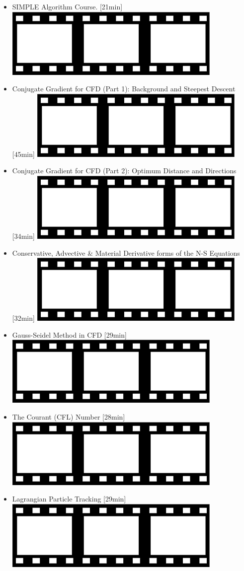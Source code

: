 \begin{itemize}

\item SIMPLE Algorithm Course. [21min]
      \href{https://www.youtube.com/watch?v=z1wMpZeVzMI}{\includegraphics[width=.8cm]{images/pictograms/film.png}}

\item Conjugate Gradient for CFD (Part 1): Background and Steepest Descent [45min]
      \href{https://www.youtube.com/watch?v=jXShvxPcRl4}{\includegraphics[width=.8cm]{images/pictograms/film.png}}

\item Conjugate Gradient for CFD (Part 2): Optimum Distance and Directions [34min]
      \href{https://www.youtube.com/watch?v=MdPhVsgTc1Q}{\includegraphics[width=.8cm]{images/pictograms/film.png}}

\item Conservative, Advective \& Material Derivative forms of the N-S Equations [32min]
      \href{https://www.youtube.com/watch?v=ljdv4T2U464}{\includegraphics[width=.8cm]{images/pictograms/film.png}}

\item Gauss-Seidel Method in CFD [29min]
      \href{https://www.youtube.com/watch?v=ymIvps7pgRk}{\includegraphics[width=.8cm]{images/pictograms/film.png}}

\item The Courant (CFL) Number [28min]
      \href{https://www.youtube.com/watch?v=WBWY46ynRk0}{\includegraphics[width=.8cm]{images/pictograms/film.png}}

\item Lagrangian Particle Tracking [29min]
      \href{https://www.youtube.com/watch?v=jdq6puyvQ7E}{\includegraphics[width=.8cm]{images/pictograms/film.png}}


\end{itemize}
